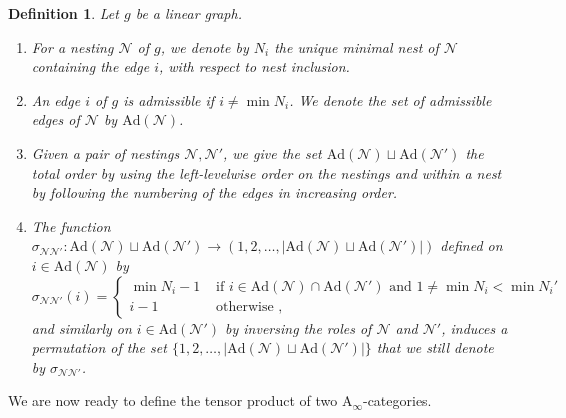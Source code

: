 \documentclass[twoside, 12pt]{amsart}
\newtheorem{definition}{Definition}[section]
\theoremstyle{remark}
\begin{document}
\begin{definition} \label{def:signs}
Let $g$ be a linear graph.  
\begin{enumerate}[leftmargin=*]
\item For a nesting $\mathcal{N}$ of $g$, we denote by $N_i$ the unique minimal nest of $\mathcal{N}$ containing the edge $i$, with respect to nest inclusion. 
\item An edge $i$ of $g$ is \emph{admissible} if $i \neq \min N_i$. We denote the set of admissible edges of $\mathcal{N}$ by $\mathrm{Ad}(\mathcal{N})$. 
\item Given a pair of nestings $\mathcal{N}, \mathcal{N}'$, we give the set $\mathrm{Ad}(\mathcal{N})\sqcup \mathrm{Ad}(\mathcal{N}')$ the total order by using the left-levelwise order on the nestings and within a nest by following the numbering of the edges in increasing order. 
\item The function $\sigma_{\mathcal{N}\mathcal{N}'}: \mathrm{Ad}(\mathcal{N})\sqcup \mathrm{Ad}(\mathcal{N}') \to (1,2,\ldots,|\mathrm{Ad}(\mathcal{N})\sqcup \mathrm{Ad}(\mathcal{N}')|)$ defined on $i \in \mathrm{Ad}(\mathcal{N})$ by 
\begin{equation*}
  \sigma_{\mathcal{N}\mathcal{N}'}(i)= 
  \begin{cases}
    \min N_i -1 & \text{ if } i \in \mathrm{Ad}(\mathcal{N})\cap \mathrm{Ad}(\mathcal{N}') \text{ and } 1 \neq \min N_i < \min N_i' \\ 
    i-1 & \text{ otherwise ,} 
  \end{cases}
\end{equation*}
and similarly on $i \in \mathrm{Ad}(\mathcal{N}')$ by inversing the roles of $\mathcal{N}$ and $\mathcal{N}'$, induces a permutation of the set $\{1,2,\ldots,|\mathrm{Ad}(\mathcal{N})\sqcup \mathrm{Ad}(\mathcal{N}')|\}$ that we still denote by $\sigma_{\mathcal{N}\mathcal{N}'}$.
\end{enumerate}
\end{definition}

We are now ready to define the tensor product of two $\mathrm{A}_\infty$-categories.
\end{document}
